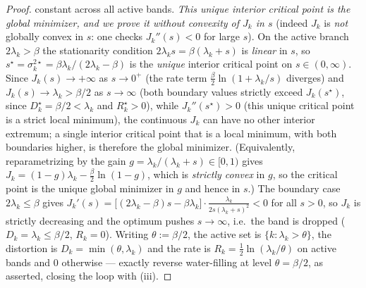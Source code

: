 \begin{proof}
constant across all active bands. \emph{This unique interior critical point is the global minimizer, and we prove it without convexity of $J_k$ in $s$} (indeed $J_k$ is \emph{not} globally convex in $s$: one checks $J_k''(s)<0$ for large $s$). On the active branch $2\lambda_k>\beta$ the stationarity condition $2\lambda_k s=\beta(\lambda_k+s)$ is \emph{linear} in $s$, so $s^\star=\sigma_k^{2\star}=\beta\lambda_k/(2\lambda_k-\beta)$ is the \emph{unique} interior critical point on $s\in(0,\infty)$. Since $J_k(s)\to+\infty$ as $s\to0^+$ (the rate term $\tfrac{\beta}{2}\ln(1+\lambda_k/s)$ diverges) and $J_k(s)\to\lambda_k>\beta/2$ as $s\to\infty$ (both boundary values strictly exceed $J_k(s^\star)$, since $D_k^\star=\beta/2<\lambda_k$ and $R_k^\star>0$), while $J_k''(s^\star)>0$ (this unique critical point is a strict local minimum), the continuous $J_k$ can have no other interior extremum; a single interior critical point that is a local minimum, with both boundaries higher, is therefore the global minimizer. (Equivalently, reparametrizing by the gain $g=\lambda_k/(\lambda_k+s)\in[0,1)$ gives $J_k=(1-g)\lambda_k-\tfrac{\beta}{2}\ln(1-g)$, which is \emph{strictly convex} in $g$, so the critical point is the unique global minimizer in $g$ and hence in $s$.) The boundary case $2\lambda_k\le\beta$ gives $J_k'(s)=\big[(2\lambda_k-\beta)s-\beta\lambda_k\big]\cdot\tfrac{\lambda_k}{2s(\lambda_k+s)^2}<0$ for all $s>0$, so $J_k$ is strictly decreasing and the optimum pushes $s\to\infty$, i.e.\ the band is dropped ($D_k=\lambda_k\le\beta/2$, $R_k=0$). Writing $\theta:=\beta/2$, the active set is $\{k:\lambda_k>\theta\}$, the distortion is $D_k=\min(\theta,\lambda_k)$ and the rate is $R_k=\tfrac12\ln(\lambda_k/\theta)$ on active bands and $0$ otherwise --- exactly reverse water-filling at level $\theta=\beta/2$, as asserted, closing the loop with (iii).
\end{proof}

